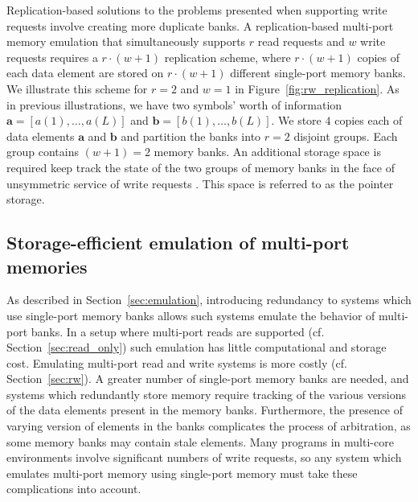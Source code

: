 Replication-based solutions to the problems presented when supporting write requests involve creating more duplicate banks. A replication-based multi-port memory emulation that simultaneously supports $r$ read requests and $w$ write requests requires a $r\cdot(w + 1)$ replication scheme, where $r\cdot(w+1)$ copies of each data element are stored on $r\cdot(w + 1)$ different single-port memory banks. We illustrate this scheme for $r = 2$ and $w = 1$ in Figure~\ref{fig:rw_replication}. As in previous illustrations, we have two symbols' worth of information $\mathbf{a} = [a(1),\ldots, a(L)]$ and $\mathbf{b}  = [b(1),\ldots, b(L)]$. We store $4$ copies each of data elements $\mathbf{a}$ and $\mathbf{b}$ and partition the banks into $r = 2$ disjoint groups. Each group contains $(w + 1) = 2$ memory banks. An additional storage space is required keep track the state of the two groups of memory banks in the face of unsymmetric service of write requests . This space is referred to as the pointer storage.


\subsection{Storage-efficient emulation of multi-port memories}
\label{sec:efficient_emulation}

As described in Section~\ref{sec:emulation}, introducing redundancy to systems which use single-port memory banks allows such systems emulate the behavior of multi-port banks. In a setup where multi-port reads are supported (cf. Section~\ref{sec:read_only}) such emulation has little computational and storage cost. Emulating multi-port read and write systems is more costly (cf. Section~\ref{sec:rw}). A greater number of single-port memory banks are needed, and systems which redundantly store memory require tracking of the various versions of the data elements present in the memory banks. Furthermore, the presence of varying version of elements in the banks complicates the process of arbitration, as some memory banks may contain stale elements. Many programs in multi-core environments involve significant numbers of write requests, so any system which emulates multi-port memory using single-port memory must take these complications into account.


